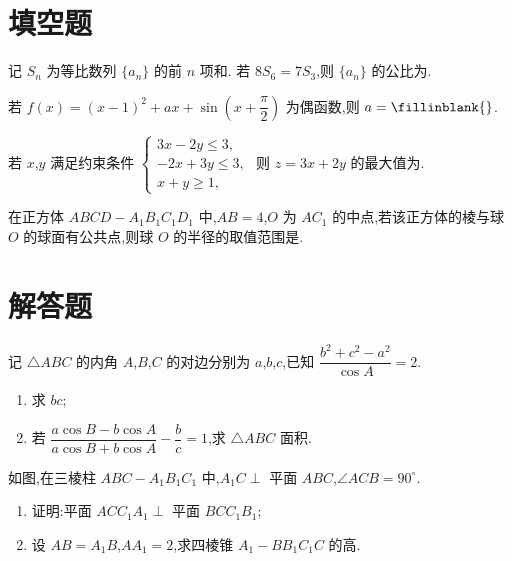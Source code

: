 \section{填空题}

\begin{problem}
记 \(S_n\) 为等比数列 \(\{a_n\}\) 的前 \(n\) 项和. 若 \(8S_6=7S_3\),则 \(\{a_n\}\) 的公比为\fillinblank{}.
\end{problem}

\begin{problem}
若 \(f(x)=\left(x-1\right)^2+ax+\sin\left(x+\dfrac{\pi}{2}\right)\) 为偶函数,则 \(a=\fillinblank{}\).
\end{problem}

\begin{problem}
若 \(x\),\(y\) 满足约束条件
\(\begin{cases}
3x-2y\le3,\\
-2x+3y\le3,\\
x+y\ge1,
\end{cases}\)
则 \(z=3x+2y\) 的最大值为\fillinblank{}.
\end{problem}

\begin{problem}
在正方体 \(ABCD-A_1B_1C_1D_1\) 中,\(AB=4\),\(O\) 为 \(AC_1\) 的中点,若该正方体的棱与球 \(O\) 的球面有公共点,则球 \(O\) 的半径的取值范围是\fillinblank{}.
\end{problem}

\section{解答题}

\begin{problem}
记 \(\triangle ABC\) 的内角 \(A\),\(B\),\(C\) 的对边分别为 \(a\),\(b\),\(c\),已知 \(\dfrac{b^2+c^2-a^2}{\cos A}=2\).
\begin{enumerate}
\item 求 \(bc\);
\item 若 \(\dfrac{a\cos B-b\cos A}{a\cos B+b\cos A}-\dfrac{b}{c}=1\),求 \(\triangle ABC\) 面积.
\end{enumerate}
\end{problem}

\begin{problem}
如图,在三棱柱 \(ABC-A_1B_1C_1\) 中,\(A_1C\perp\) 平面 \(ABC\),\(\angle ACB=90^\circ\).

\begin{enumerate}
\item 证明:平面 \(ACC_1A_1\perp\) 平面 \(BCC_1B_1\);
\item 设 \(AB=A_1B\),\(AA_1=2\),求四棱锥 \(A_1-BB_1C_1C\) 的高.
\end{enumerate}

\end{problem}

